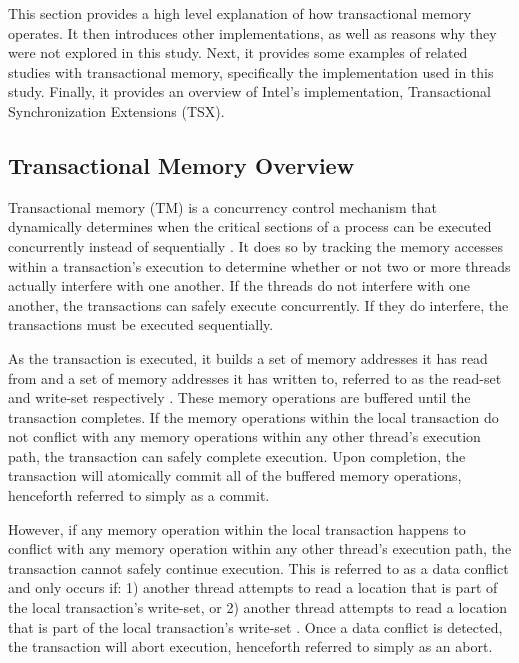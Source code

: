 \documentclass[a4paper]{article}
\begin{document}
\indent This section provides a high level explanation of how transactional
memory operates.  It then introduces other implementations, as well as reasons
why they were not explored in this study.  Next, it provides some examples of
related studies with transactional memory, specifically the implementation used
in this study. Finally, it provides an overview of Intel's implementation,
Transactional Synchronization Extensions (TSX).\par

\subsection{\textbf{Transactional Memory Overview}}

\indent Transactional memory (TM) is a concurrency control mechanism that
dynamically determines when the critical sections of a process can be executed
concurrently instead of sequentially \cite{sle_rajwar}.  It does so by tracking
the memory accesses within a transaction's execution to determine whether or not
two or more threads actually interfere with one another.  If the threads do not
interfere with one another, the transactions can safely execute concurrently.
If they do interfere, the transactions must be executed sequentially.\par

\indent As the transaction is executed, it builds a set of memory addresses it
has read from and a set of memory addresses it has written to, referred to as
the read-set and write-set respectively \cite{intel_prog_ref}.  These memory
operations are buffered until the transaction completes.  If the  memory
operations within the local transaction do not conflict with any memory
operations within any other thread's execution path, the transaction can safely
complete execution.  Upon completion, the transaction will atomically commit all of
the buffered memory operations, henceforth referred to simply as a commit.\par

\indent However, if any memory operation within the local transaction happens to  
conflict with any memory operation within any other thread's execution path, the
transaction cannot safely continue execution.  This is referred to as a data
conflict and only occurs if: 1) another thread attempts to read a location that
is part of the local transaction's write-set, or 2) another thread attempts to
read a location that is part of the local transaction's write-set
\cite{intel_prog_ref}.  Once a data conflict is detected, the transaction will
abort execution, henceforth referred to simply as an abort.\par
\end{document}
